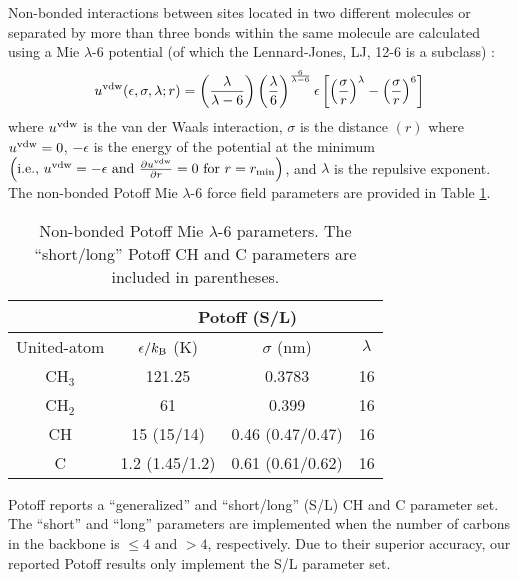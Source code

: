 \documentclass[preprint,review,12pt]{elsarticle}
\begin{document}
	Non-bonded interactions between sites located in two different molecules or separated by more than three bonds within the same molecule are calculated using a Mie $\lambda$-6 potential (of which the Lennard-Jones, LJ, 12-6 is a subclass) \cite{Herdes2015}:
	\begin{equation} \label{eq:Mie}
	u^{\rm vdw}(\epsilon,\sigma,\lambda;r) = \left(\frac{\lambda}{\lambda - 6}\right)\left(\frac{\lambda}{6}\right)^{\frac{6}{\lambda - 6}} \epsilon \left[\left(\frac{\sigma}{r}\right)^{\lambda} - \left(\frac{\sigma}{r}\right)^6\right]
	\end{equation} 
	where $u^{\rm vdw}$ is the van der Waals interaction, $\sigma$ is the distance $(r)$ where $u^{\rm vdw} = 0$, $-\epsilon$ is the energy of the potential at the minimum $\left(\text{i.e., }u^{\rm vdw} = -\epsilon \text{ and } \frac{\partial u^{\rm vdw}}{\partial r} = 0 \text{ for } r=r_{\rm min} \right)$, and $\lambda$ is the repulsive exponent. The non-bonded Potoff Mie $\lambda$-6 force field parameters are provided in Table \ref{tab:nonbonded params}. 
	
	\begin{table}[h!]
		\caption{Non-bonded Potoff Mie $\lambda$-6 parameters. The ``short/long'' Potoff CH and C parameters are included in parentheses.} \label{tab:nonbonded params}
		\begin{center}
			\begin{tabular}{|c|c|c|c|}
				\hline
				\multicolumn{1}{|c}{} & \multicolumn{3}{|c|}{Potoff (S/L)}  \\ \hline
				United-atom & $\epsilon/k_{\rm B}$ (K) & $\sigma$ (nm) & $\lambda$ \\ \hline
				CH$_3$ & 121.25 & 0.3783 & 16  \\ 
				CH$_2$ & 61 & 0.399 & 16 \\ 
				CH & 15 (15/14) & 0.46 (0.47/0.47) & 16\\
				C & 1.2 (1.45/1.2) & 0.61 (0.61/0.62) & 16\\
				\hline
			\end{tabular}
		\end{center} 
	\end{table}
	
	Potoff reports a ``generalized'' and ``short/long'' (S/L) CH and C parameter set. The ``short'' and ``long'' parameters are implemented when the number of carbons in the backbone is $\le 4$ and $> 4$, respectively. Due to their superior accuracy, our reported Potoff results only implement the S/L parameter set.
	
\end{document}
